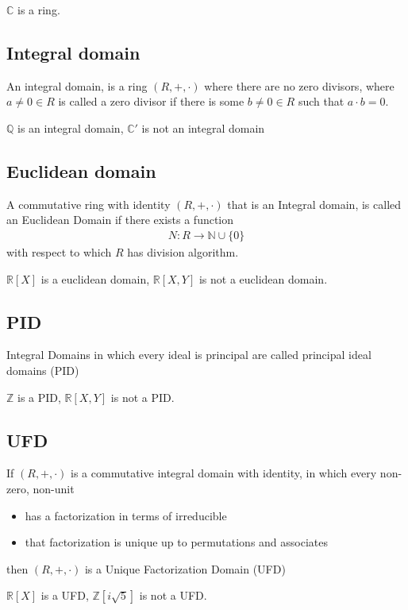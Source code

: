 \documentclass[10pt]{amsart}
\newcommand{\Z}{\mathbb{Z}}
\newcommand{\R}{\mathbb{R}}
\newcommand{\N}{\mathbb{N}}
\newcommand{\C}{\mathbb{C}}
\newcommand{\Q}{\mathbb{Q}}
\newcommand{\ra}{\rightarrow}
\begin{document}
$\C$ is a ring.

\subsection{Integral domain}%
\label{sub:integral_domain}

An integral domain, is a ring $(R,+,\cdot)$ where there are no zero divisors,
where $a\neq0\in R$ is called a zero divisor if there is some $b\neq0\in R$
such that $a\cdot b=0$.

$\Q$ is an integral domain, $\C'$ is not an integral domain

\subsection{Euclidean domain}%
\label{sub:euclidean_domain}

A commutative ring with identity $(R,+,\cdot)$ that is an Integral domain, is
called an Euclidean Domain if there exists a function
\begin{align*}
  N:R\ra\N\cup\{0\}
\end{align*}
with respect to which $R$ has division algorithm.

$\R[X]$ is a euclidean domain, $\R[X,Y]$ is not a euclidean domain.

\subsection{PID}%
\label{sub:pid}

Integral Domains in which every ideal is principal are called principal ideal
domains (PID)

$\Z$ is a PID, $\R[X,Y]$ is not a PID\@.

\subsection{UFD}%
\label{sub:ufd}

If $(R,+,\cdot)$ is a commutative integral domain with identity, in which every
non-zero, non-unit
\begin{itemize}
  \item has a factorization in terms of irreducible
  \item that factorization is unique up to permutations and associates
\end{itemize}
then $(R,+,\cdot)$ is a Unique Factorization Domain (UFD)

$\R[X]$ is a UFD, $\Z[i\sqrt{5}]$ is not a UFD\@.
\end{document}
